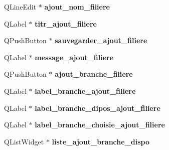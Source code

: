 \begin{DoxyCompactItemize}
\item 
\hypertarget{class_ui___administration_a541f219c826000331b9cff4d3c72ac15}{Q\+Line\+Edit $\ast$ {\bfseries ajout\+\_\+nom\+\_\+filiere}}\label{class_ui___administration_a541f219c826000331b9cff4d3c72ac15}

\item 
\hypertarget{class_ui___administration_a73e01e587e544dcdd7bdc8acb2b41c7c}{Q\+Label $\ast$ {\bfseries titr\+\_\+ajout\+\_\+filiere}}\label{class_ui___administration_a73e01e587e544dcdd7bdc8acb2b41c7c}

\item 
\hypertarget{class_ui___administration_a8be0c64a0d7c957ab2c5f0e83206b562}{Q\+Push\+Button $\ast$ {\bfseries sauvegarder\+\_\+ajout\+\_\+filiere}}\label{class_ui___administration_a8be0c64a0d7c957ab2c5f0e83206b562}

\item 
\hypertarget{class_ui___administration_a4c526f4c4f8701cc9104dbe14219702e}{Q\+Label $\ast$ {\bfseries message\+\_\+ajout\+\_\+filiere}}\label{class_ui___administration_a4c526f4c4f8701cc9104dbe14219702e}

\item 
\hypertarget{class_ui___administration_a18cc7081c56cbfe3e6904fcf51406bab}{Q\+Push\+Button $\ast$ {\bfseries ajout\+\_\+branche\+\_\+filiere}}\label{class_ui___administration_a18cc7081c56cbfe3e6904fcf51406bab}

\item 
\hypertarget{class_ui___administration_aae330a58d0d1a237f58aa65f0043c511}{Q\+Label $\ast$ {\bfseries label\+\_\+branche\+\_\+ajout\+\_\+filiere}}\label{class_ui___administration_aae330a58d0d1a237f58aa65f0043c511}

\item 
\hypertarget{class_ui___administration_a9a6afd38b032581a8a4364339fb792f3}{Q\+Label $\ast$ {\bfseries label\+\_\+branche\+\_\+dipos\+\_\+ajout\+\_\+filiere}}\label{class_ui___administration_a9a6afd38b032581a8a4364339fb792f3}

\item 
\hypertarget{class_ui___administration_a8c4a31c18a350742367d8858b250a422}{Q\+Label $\ast$ {\bfseries label\+\_\+branche\+\_\+choisie\+\_\+ajout\+\_\+filiere}}\label{class_ui___administration_a8c4a31c18a350742367d8858b250a422}

\item 
\hypertarget{class_ui___administration_a8ffcc3ea2e05b8c093b510cf4af2861e}{Q\+List\+Widget $\ast$ {\bfseries liste\+\_\+ajout\+\_\+branche\+\_\+dispo}}\label{class_ui___administration_a8ffcc3ea2e05b8c093b510cf4af2861e}


\end{DoxyCompactItemize}
